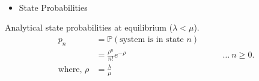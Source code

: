 \documentclass[11pt]{article}
\providecommand{\tightlist}{%
      \setlength{\itemsep}{0pt}\setlength{\parskip}{0pt}}
\begin{document}
    \begin{center}
    \end{center}
    { \hspace*{\fill} \\}
    
    \begin{itemize}
\tightlist
\item
  State Probabilities
\end{itemize}

Analytical state probabilities at equilibrium (\(\lambda < \mu\)).
\begin{align}
 p_n &= \mathbb{P}(\text{system is in state }n) \\
 &= \frac{\rho^n}{n!} e^{-\rho}\ &&\quad\ \ldots\ n \geq 0.\\
 \text{where, } \rho &= \frac{\lambda}{\mu} 
\end{align}
\end{document}
